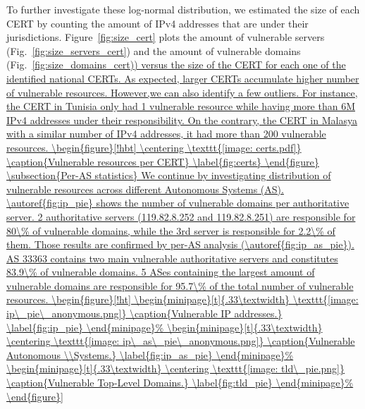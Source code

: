 To further investigate these log-normal distribution, we estimated the size of each CERT by counting the amount of IPv4 addresses that are under their jurisdictions. Figure~\ref{fig:size_cert} plots the amount of vulnerable servers (Fig.~\ref{fig:size_servers_cert}) and the amount of vulnerable domains (Fig.~\ref{fig:size_domains_cert)) versus the size of the CERT for each one of the identified national CERTs.
As expected, larger CERTs accumulate higher number of vulnerable resources. However,we can also identify a few outliers. For instance, the CERT in Tunisia only had 1 vulnerable resource while having more than 6M IPv4 addresses under their responsibility. On the contrary, the CERT in Malasya with a similar number of IPv4 addresses, it had more than 200 vulnerable resources. 


\begin{figure}[!hbt]
\centering
\texttt{[image: certs.pdf]}
\caption{Vulnerable resources per CERT}
\label{fig:certs}
\end{figure}

\subsection{Per-AS statistics}
We continue by investigating distribution of vulnerable resources across different Autonomous Systems (AS). \autoref{fig:ip_pie} shows the number of vulnerable domains per authoritative server. 2 authoritative servers (119.82.8.252 and 119.82.8.251) are responsible for 80\% of vulnerable domains, while the 3rd server is responsible for 2.2\% of them. 

Those results are confirmed by per-AS analysis (\autoref{fig:ip_as_pie}). AS 33363 contains two main vulnerable authoritative servers and constitutes 83.9\% of vulnerable domains. 5 ASes containing the largest amount of vulnerable domains are responsible for 95.7\% of the total number of vulnerable resources. 

\begin{figure}[!ht]
\begin{minipage}[t]{.33\textwidth}
    \texttt{[image: ip\_pie\_anonymous.png]}
    \caption{Vulnerable IP addresses.}
    \label{fig:ip_pie}
\end{minipage}%
\begin{minipage}[t]{.33\textwidth}
    \centering
    \texttt{[image: ip\_as\_pie\_anonymous.png]}
    \caption{Vulnerable Autonomous \\Systems.}
    \label{fig:ip_as_pie}
\end{minipage}%
\begin{minipage}[t]{.33\textwidth}
    \centering
    \texttt{[image: tld\_pie.png]}
    \caption{Vulnerable Top-Level Domains.}
    \label{fig:tld_pie}
\end{minipage}%


\end{figure}}
